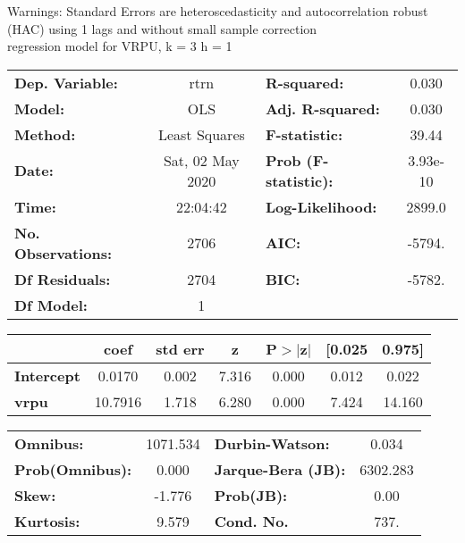 Warnings: \newline
 [1] Standard Errors are heteroscedasticity and autocorrelation robust (HAC) using 1 lags and without small sample correction\\ 

regression model for VRPU, k = 3 h = 1\begin{center}
\begin{tabular}{lclc}
\toprule
\textbf{Dep. Variable:}    &       rtrn       & \textbf{  R-squared:         } &     0.030   \\
\textbf{Model:}            &       OLS        & \textbf{  Adj. R-squared:    } &     0.030   \\
\textbf{Method:}           &  Least Squares   & \textbf{  F-statistic:       } &     39.44   \\
\textbf{Date:}             & Sat, 02 May 2020 & \textbf{  Prob (F-statistic):} &  3.93e-10   \\
\textbf{Time:}             &     22:04:42     & \textbf{  Log-Likelihood:    } &    2899.0   \\
\textbf{No. Observations:} &        2706      & \textbf{  AIC:               } &    -5794.   \\
\textbf{Df Residuals:}     &        2704      & \textbf{  BIC:               } &    -5782.   \\
\textbf{Df Model:}         &           1      & \textbf{                     } &             \\
\bottomrule
\end{tabular}
\begin{tabular}{lcccccc}
                   & \textbf{coef} & \textbf{std err} & \textbf{z} & \textbf{P$> |$z$|$} & \textbf{[0.025} & \textbf{0.975]}  \\
\midrule
\textbf{Intercept} &       0.0170  &        0.002     &     7.316  &         0.000        &        0.012    &        0.022     \\
\textbf{vrpu}      &      10.7916  &        1.718     &     6.280  &         0.000        &        7.424    &       14.160     \\
\bottomrule
\end{tabular}
\begin{tabular}{lclc}
\textbf{Omnibus:}       & 1071.534 & \textbf{  Durbin-Watson:     } &    0.034  \\
\textbf{Prob(Omnibus):} &   0.000  & \textbf{  Jarque-Bera (JB):  } & 6302.283  \\
\textbf{Skew:}          &  -1.776  & \textbf{  Prob(JB):          } &     0.00  \\
\textbf{Kurtosis:}      &   9.579  & \textbf{  Cond. No.          } &     737.  \\
\bottomrule
\end{tabular}
\end{center}

